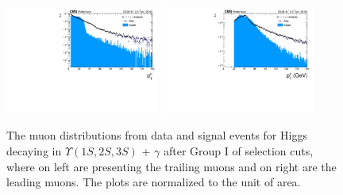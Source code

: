 \begin{figure}[!htbp]
\begin{center}
\includegraphics[width=0.45\textwidth]{figures/outputPlots/HtoUpsilon_Cat0_ZZZZZ/au/data_x_mc/noKinCuts/h_noKin_TrailingMu_pt}\hspace*{1.cm}
\includegraphics[width=0.45\textwidth]{figures/outputPlots/HtoUpsilon_Cat0_ZZZZZ/au/data_x_mc/noKinCuts/h_noKin_LeadingMu_pt}
\end{center}\vspace*{-.5cm}
\caption{The \PT muon distributions from data and signal events for Higgs decaying in $\Upsilon(1S,2S,3S)$ + $\gamma$ after Group I of selection cuts, where on left are presenting the trailing muons and on right are the leading muons. The plots are normalized to the unit of area.}
\label{fig:pTMuons_HtoUpsilon_Cat0}
\end{figure}


